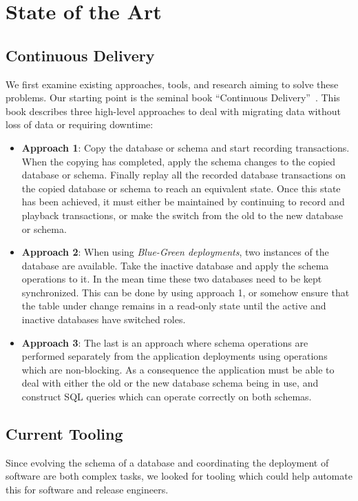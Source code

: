 \documentclass[conference]{IEEEtran}
\begin{document}
\section{State of the Art} %


\subsection{Continuous Delivery}\label{sec:cd}

We first examine existing approaches, tools, and research aiming to solve these problems. Our starting point is the seminal book ``Continuous Delivery''~\cite{Humble:2010:CDR:1869904}. This book describes three high-level approaches to deal with migrating data without loss of data or requiring downtime:

\begin{itemize}
  \item{\textbf{Approach 1}: Copy the database or schema and start recording transactions. When the copying has completed, apply the schema changes to the copied database or schema. Finally replay all the recorded database transactions on the copied database or schema to reach an equivalent state. Once this state has been achieved, it must either be maintained by continuing to record and playback transactions, or make the switch from the old to the new database or schema.}
  \item{\textbf{Approach 2}: When using \textit{Blue-Green deployments}, two instances of the database are available. Take the inactive database and apply the schema operations to it. In the mean time these two databases need to be kept synchronized. This can be done by using approach 1, or somehow ensure that the table under change remains in a read-only state until the active and inactive databases have switched roles.}
  \item{\textbf{Approach 3}: The last is an approach where schema operations are performed separately from the application deployments using operations which are non-blocking. As a consequence the application must be able to deal with either the old or the new database schema being in use, and construct SQL queries which can operate correctly on both schemas.}
\end{itemize}

\subsection{Current Tooling} 
Since evolving the schema of a database and coordinating the deployment of software are both complex tasks, we looked for tooling which could help automate this for software and release engineers.
\end{document}
